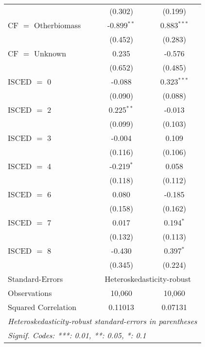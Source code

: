 \begin{table}[htbp!]
\begin{adjustbox}{width = 1\textwidth, max height = 0.95\textheight, center}
\begin{threeparttable}[b]
\begin{tabular}{lcc}
                                 & (0.302)        & (0.199)\\   
            CF $=$ Otherbiomass  & -0.899$^{**}$  & 0.883$^{***}$\\   
                                 & (0.452)        & (0.283)\\   
            CF $=$ Unknown       & 0.235          & -0.576\\   
                                 & (0.652)        & (0.485)\\   
            ISCED $=$ 0          & -0.088         & 0.323$^{***}$\\   
                                 & (0.090)        & (0.088)\\   
            ISCED $=$ 2          & 0.225$^{**}$   & -0.013\\   
                                 & (0.099)        & (0.103)\\   
            ISCED $=$ 3          & -0.004         & 0.109\\   
                                 & (0.116)        & (0.106)\\   
            ISCED $=$ 4          & -0.219$^{*}$   & 0.058\\   
                                 & (0.118)        & (0.112)\\   
            ISCED $=$ 6          & 0.080          & -0.185\\   
                                 & (0.158)        & (0.162)\\   
            ISCED $=$ 7          & 0.017          & 0.194$^{*}$\\   
                                 & (0.132)        & (0.113)\\   
            ISCED $=$ 8          & -0.430         & 0.397$^{*}$\\   
                                 & (0.345)        & (0.224)\\   
            \midrule 
            Standard-Errors & \multicolumn{2}{c}{Heteroskedasticity-robust} \\ 
            Observations         & 10,060         & 10,060\\  
            Squared Correlation  & 0.11013        & 0.07131\\  
            \midrule \midrule
            \multicolumn{3}{l}{\emph{Heteroskedasticity-robust standard-errors in parentheses}}\\
            \multicolumn{3}{l}{\emph{Signif. Codes: ***: 0.01, **: 0.05, *: 0.1}}\\
         \end{tabular}
         

\end{threeparttable}
\end{adjustbox}
\end{table}
